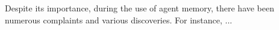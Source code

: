 Despite its importance, during the use of agent memory, there have been numerous complaints and various discoveries. For instance, ... %

